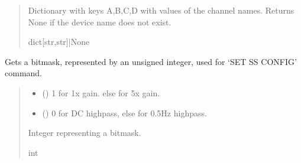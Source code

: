 \documentclass[letterpaper,10pt,english]{sphinxmanual}
\begin{document}
\begin{fulllineitems}
\begin{fulllineitems}
\begin{quote}
\begin{description}
\sphinxAtStartPar
Dictionary with keys A,B,C,D with values of the channel names. Returns                 None if the device name does not exist.

\sphinxAtStartPar
dict{[}str,str{]}|None

\end{description}\end{quote}

\end{fulllineitems}


\begin{fulllineitems}
\label{\detokenize{PodDevice_8401HR:PodDevice_8401HR.POD_8401HR.GetSSConfigBitmask}}
\pysigstartsignatures
{}
\pysigstopsignatures
\sphinxAtStartPar
Gets a bitmask, represented by an unsigned integer, used for ‘SET SS CONFIG’ command.
\begin{quote}\begin{description}
\begin{itemize}
\item {} 
\sphinxAtStartPar
{} () \textendash{} 1 for 1x gain. else for 5x gain.

\item {} 
\sphinxAtStartPar
{} () \textendash{} 0 for DC highpass, else for 0.5Hz highpass.

\end{itemize}

\sphinxAtStartPar
Integer representing a bitmask.

\sphinxAtStartPar
int

\end{description}\end{quote}

\end{fulllineitems}


\end{fulllineitems}
\end{document}
